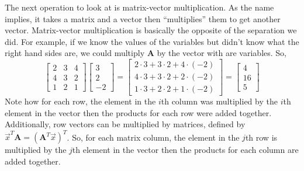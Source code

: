 \documentclass[12pt,]{article}
\newcommand{\mat}[1]{\mathbf{#1}}
\begin{document}
The next operation to look at is matrix-vector multiplication.
As the name implies, it takes a matrix and a vector then ``multiplies'' them to get another vector.
Matrix-vector multiplication is basically the opposite of the separation we did.
For example, if we know the values of the variables but didn't know what the right hand sides are, we could multiply \(\mat{A}\) by the vector with are variables.
So,
\begin{equation}
	\begin{bmatrix}
		2 & 3 & 4 \\ 4 & 3 & 2 \\ 1 & 2 & 1
	\end{bmatrix}
	\begin{bmatrix}3 \\ 2 \\ -2\end{bmatrix}
	= 
	\begin{bmatrix}
		2\cdot3 + 3\cdot2 + 4\cdot(-2) \\ 4\cdot3 + 3\cdot2 + 2\cdot(-2) \\ 1\cdot3 + 2\cdot2 + 1\cdot(-2)
	\end{bmatrix}
	=
	\begin{bmatrix}4 \\ 16 \\ 5\end{bmatrix}
\end{equation}
Note how for each row, the element in the \(i\)th column was multiplied by the \(i\)th element in the vector then the products for each row were added together.
Additionally, row vectors can be multiplied by matrices, defined by \(\vec{x}^T\mat{A} = (\mat{A}^T\vec{x})^T\).
So, for each matrix column, the element in the \(j\)th row is multiplied by the \(j\)th element in the vector then the products for each column are added together.
\end{document}
